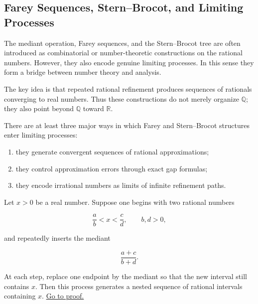 
\subsection*{Farey Sequences, Stern--Brocot, and Limiting Processes}
\label{sec:sb-limiting-processes}

\begin{exposition}
The mediant operation, Farey sequences, and the Stern--Brocot tree are
often introduced as combinatorial or number-theoretic constructions on
the rational numbers.  However, they also encode genuine limiting
processes.  In this sense they form a bridge between number theory and
analysis.
\end{exposition}

\begin{exposition}
The key idea is that repeated rational refinement produces sequences of
rationals converging to real numbers.  Thus these constructions do not
merely organize $\mathbb{Q}$; they also point beyond $\mathbb{Q}$ toward
$\mathbb{R}$.
\end{exposition}

\begin{remark*}
There are at least three major ways in which Farey and Stern--Brocot
structures enter limiting processes:

\begin{enumerate}
\item they generate convergent sequences of rational approximations;
\item they control approximation errors through exact gap formulas;
\item they encode irrational numbers as limits of infinite refinement
paths.
\end{enumerate}

\end{remark*}


\begin{theorem}
\label{thm:stern-brocot-refinement}

Let $x>0$ be a real number.  Suppose one begins with two rational
numbers

\[
\frac{a}{b} < x < \frac{c}{d},
\qquad b,d>0,
\]

and repeatedly inserts the mediant

\[
\frac{a+c}{b+d}.
\]

At each step, replace one endpoint by the mediant so that the new
interval still contains $x$.  Then this process generates a nested
sequence of rational intervals containing $x$.
\hyperref[prf:stern-brocot-refinement]{Go to proof.}
\end{theorem}

